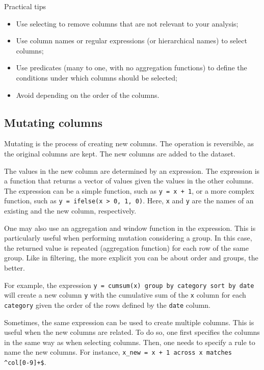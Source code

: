\begin{hlbox}{Practical tips}
  \begin{itemize}
    \item Use selecting to remove columns that are not relevant to your analysis;
    \item Use column names or regular expressions (or hierarchical names) to select columns;
    \item Use predicates (many to one, with no aggregation functions) to define the conditions
      under which columns should be selected;
    \item Avoid depending on the order of the columns.
  \end{itemize}
\end{hlbox}

\subsection{Mutating columns}

Mutating is the process of creating new columns.  The operation is reversible, as the
original columns are kept.  The new columns are added to the dataset.

The values in the new column are determined by an expression.  The expression is a
function that returns a vector of values given the values in the other columns.  The
expression can be a simple function, such as \texttt{y = x + 1}, or a more complex
function, such as \texttt{y = ifelse(x > 0, 1, 0)}.  Here, \texttt{x} and \texttt{y} are
the names of an existing and the new column, respectively.

One may also use an aggregation and window function in the expression. This is particularly
useful when performing mutation considering a group.  In this case, the returned value is
repeated (aggregation function) for each row of the same group.  Like in filtering, the
more explicit you can be about order and groups, the better.

For example, the expression \texttt{y = cumsum(x) group by category sort by date} will
create a new column \texttt{y} with the cumulative sum of the \texttt{x} column for each
\texttt{category} given the order of the rows defined by the \texttt{date} column.

Sometimes, the same expression can be used to create multiple columns.  This is useful
when the new columns are related.  To do so, one first specifies the columns in the same way as
when selecting columns.  Then, one needs to specify a rule to name the new columns.
For instance, \texttt{x\_new = x + 1 across x matches \textasciicircum{}col[0-9]+\$}.

